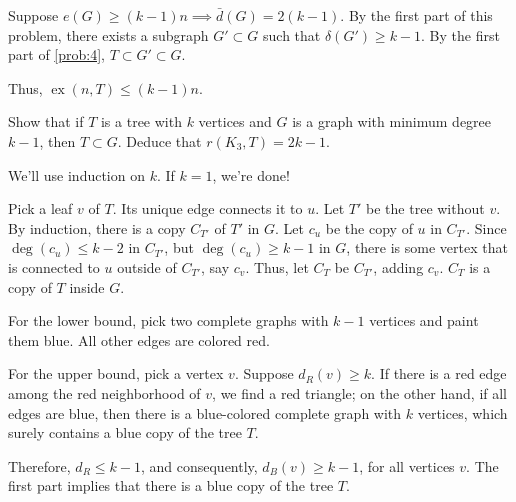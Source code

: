 \documentclass[10pt, a4paper]{article}
\DeclareMathOperator\ex{ex}
\begin{document}
\begin{sol}	
	Suppose $e(G) \geqslant (k-1)n \implies \bar{d}(G) = 2(k-1)$. By the first part of this problem, there exists a subgraph $G' \subset G$ such that $\delta(G') \geqslant k - 1$. By the first part of \cref{prob:4}, $T \subset G' \subset G$.

	Thus, $\ex(n, T) \leqslant (k-1)n$.
\end{sol}

\newpage
\begin{prob}\label{prob:4}
	Show that if $T$ is a tree with $k$ vertices and $G$ is a graph with minimum degree $k-1$, then $T \subset G$. Deduce that $r(K_3, T) = 2k-1$.
\end{prob}
\begin{sol}	
		We'll use induction on $k$. If $k = 1$, we're done!

		Pick a leaf $v$ of $T$. Its unique edge connects it to $u$. Let $T'$ be the tree without $v$. By induction, there is a copy $C_{T'}$ of $T'$ in $G$. Let $c_u$ be the copy of  $u$ in $C_{T'}$. Since $\deg(c_u) \le k - 2$ in $C_{T'}$, but $\deg(c_u) \ge k-1$ in $G$, there is some vertex that is connected to $u$ outside of $C_{T'}$, say $c_v$. Thus, let $C_{T}$ be $C_{T'}$, adding $c_v$. $C_{T}$ is a copy of $T$ inside $G$.
\end{sol}
\begin{sol}
	For the lower bound, pick two complete graphs with $k-1$ vertices and paint them blue. All other edges are colored red.

	For the upper bound, pick a vertex $v$. Suppose $d_R(v) \ge k$. If there is a red edge among the red neighborhood of $v$, we find a red triangle; on the other hand, if all edges are blue, then there is a blue-colored complete graph with $k$ vertices, which surely contains a blue copy of the tree $T$. 

	Therefore, $d_R \le k - 1$, and consequently, $d_B(v) \ge k -1$, for all vertices $v$. The first part implies that there is a blue copy of the tree $T$.
\end{sol}
\end{document}
